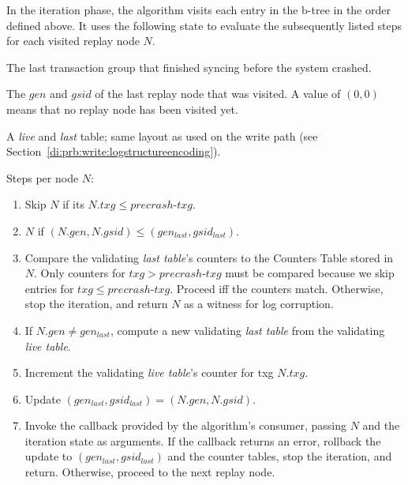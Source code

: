 \documentclass[12pt,a4paper,twoside]{book}
\begin{document}
\begin{samepage}
In the iteration phase, the algorithm visits each entry in the b-tree in the order defined above.
It uses the following state to evaluate the subsequently listed steps for each visited replay node $N$.
 \begin{description}[noitemsep,leftmargin=1.5cm,labelindent=1cm]
    \item[precrash-txg] The last transaction group that finished syncing before the system crashed.
    \item[$\mathbf{(gen_{last}, gsid_{last})}$] The $gen$ and $gsid$ of the last replay node that was visited.
        A value of $(0,0)$ means that no replay node has been visited yet.
    \item[validating counter tables] A \textit{live} and \textit{last} table; same layout as used on the write path (see Section~\ref{di:prb:write:logstructureencoding}).
\end{description}
Steps per node $N$:
\begin{enumerate}[noitemsep]
    \item \label{replayStep:skiptxg} Skip $N$ if its $N.txg \le precrash\text{-}txg$.
    \item \label{replayStep:skipreplayed} $N$ if $(N.gen,N.gsid) \le (gen_{last}, gsid_{last})$.
    \item \label{replayStep:validate} Compare the validating \textit{last table}'s counters to the Counters Table stored in $N$.
        Only counters for $txg > precrash\text{-}txg$ must be compared because we skip entries for $txg \le precrash\text{-}txg$.
        Proceed iff the counters match. Otherwise, stop the iteration, and return $N$ as a witness for log corruption.
    \item \label{replayStep:bump1} If $N.gen \neq gen_{last}$, compute a new validating \textit{last table} from the validating \textit{live table}.
    \item \label{replayStep:bump2} Increment the validating \textit{live table}'s counter for txg $N.txg$.
    \item \label{replayStep:bump3} Update $(gen_{last}, gsid_{last}) = (N.gen, N.gsid)$.
    \item \label{replayStep:invoke} Invoke the callback provided by the algorithm's consumer, passing $N$ and the iteration state as arguments.
        If the callback returns an error, rollback the update to $(gen_{last}, gsid_{last})$ and the counter tables, stop the iteration, and return.
        Otherwise, proceed to the next replay node.
\end{enumerate}
\end{samepage}
\end{document}
